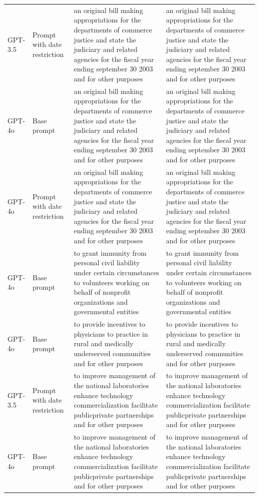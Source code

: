 \begin{longtable}{>{\raggedright\arraybackslash}p{1.4cm}>{\raggedright\arraybackslash}p{1.4cm}>{\raggedright\arraybackslash}p{5.5cm}>{\raggedright\arraybackslash}p{5.5cm}}
GPT-3.5 & Prompt with date restriction & an original bill making appropriations for the departments of commerce justice and state the judiciary and related agencies for the fiscal year ending september 30 2003 and for other purposes & an original bill making appropriations for the departments of commerce justice and state the judiciary and related agencies for the fiscal year ending september 30 2003 and for other purposes\\
GPT-4o & Base prompt & an original bill making appropriations for the departments of commerce justice and state the judiciary and related agencies for the fiscal year ending september 30 2003 and for other purposes & an original bill making appropriations for the departments of commerce justice and state the judiciary and related agencies for the fiscal year ending september 30 2003 and for other purposes\\
GPT-4o & Prompt with date restriction & an original bill making appropriations for the departments of commerce justice and state the judiciary and related agencies for the fiscal year ending september 30 2003 and for other purposes & an original bill making appropriations for the departments of commerce justice and state the judiciary and related agencies for the fiscal year ending september 30 2003 and for other purposes\\
GPT-4o & Base prompt & to grant immunity from personal civil liability under certain circumstances to volunteers working on behalf of nonprofit organizations and governmental entities & to grant immunity from personal civil liability under certain circumstances to volunteers working on behalf of nonprofit organizations and governmental entities\\
GPT-4o & Base prompt & to provide incentives to physicians to practice in rural and medically underserved communities and for other purposes & to provide incentives to physicians to practice in rural and medically underserved communities and for other purposes\\
GPT-3.5 & Prompt with date restriction & to improve management of the national laboratories enhance technology commercialization facilitate publicprivate partnerships and for other purposes & to improve management of the national laboratories enhance technology commercialization facilitate publicprivate partnerships and for other purposes\\
GPT-4o & Base prompt & to improve management of the national laboratories enhance technology commercialization facilitate publicprivate partnerships and for other purposes & to improve management of the national laboratories enhance technology commercialization facilitate publicprivate partnerships and for other purposes\\

\end{longtable}
